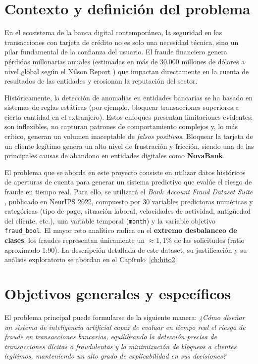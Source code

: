 \documentclass[12pt,a4paper]{report}
\begin{document}
\section{Contexto y definición del problema}
En el ecosistema de la banca digital contemporánea, la seguridad en las transacciones con tarjeta de crédito no es solo una necesidad técnica, sino un pilar fundamental de la confianza del usuario. El fraude financiero genera pérdidas millonarias anuales (estimadas en más de 30.000 millones de dólares a nivel global según el Nilson Report \cite{nilson2023}) que impactan directamente en la cuenta de resultados de las entidades y erosionan la reputación del sector. 

Históricamente, la detección de anomalías en entidades bancarias se ha basado en sistemas de reglas estáticas \cite{baesens2015fraud} (por ejemplo, bloquear transacciones superiores a cierta cantidad en el extranjero). Estos enfoques presentan limitaciones evidentes: son inflexibles, no capturan patrones de comportamiento complejos y, lo más crítico, generan un volumen inaceptable de \textit{falsos positivos}. Bloquear la tarjeta de un cliente legítimo genera un alto nivel de frustración y fricción, siendo una de las principales causas de abandono en entidades digitales como \textbf{NovaBank}.

El problema que se aborda en este proyecto consiste en utilizar datos históricos de aperturas de cuenta para generar un sistema predictivo que evalúe el riesgo de fraude en tiempo real. Para ello, se utilizará el \textit{Bank Account Fraud Dataset Suite} \cite{jesus2022bank}, publicado en NeurIPS 2022, compuesto por 30 variables predictoras numéricas y categóricas (tipo de pago, situación laboral, velocidades de actividad, antigüedad del cliente, etc.), una variable temporal (\texttt{month}) y la variable objetivo \texttt{fraud\_bool}. El mayor reto analítico radica en el \textbf{extremo desbalanceo de clases}: los fraudes representan únicamente un $\approx 1{,}1\%$ de las solicitudes (ratio aproximado 1:90). La descripción detallada de este dataset, su justificación y su análisis exploratorio se abordan en el Capítulo~\ref{ch:hito2}.

\section{Objetivos generales y específicos}
El problema principal puede formularse de la siguiente manera: \textit{¿Cómo diseñar un sistema de inteligencia artificial capaz de evaluar en tiempo real el riesgo de fraude en transacciones bancarias, equilibrando la detección precisa de transacciones ilícitas o fraudulentas y la minimización de bloqueos a clientes legítimos, manteniendo un alto grado de explicabilidad en sus decisiones?}
\end{document}
